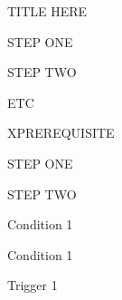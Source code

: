 \documentclass[10pt,a4paper]{article}
\begin{document}
\begin{uc}{TITLE HERE}


    \begin{uc-mss}
    \item STEP ONE
    \item STEP TWO 
    \item ETC
    \end{uc-mss}

    \begin{uc-ext}

        \begin{uc-fail}{X}{PREREQUISITE}
        \item STEP ONE
        \item STEP TWO
        \end{uc-fail}

    \end{uc-ext}

    \begin{uc-pre}
    \item Condition 1
    \end{uc-pre}

    \begin{uc-post}
    \item Condition 1
    \end{uc-post}

    \begin{uc-trig}
    Trigger 1
    \end{uc-trig}

\end{uc}
\end{document}
